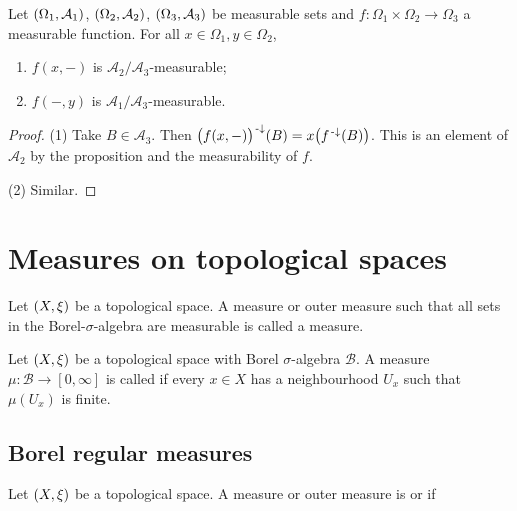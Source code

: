 \begin{corollary} \label{partialApplicationMeasurable}
Let $\sSet{\Omega_1, \mathcal{A}_1}$, $\sSet{\Omega_2, \mathcal{A}_2}$, $\sSet{\Omega_3, \mathcal{A}_3}$ be measurable sets and $f: \Omega_1\times\Omega_2 \to \Omega_3$ a measurable function. For all $x\in\Omega_1, y\in\Omega_2$,
\begin{enumerate}
\item $f(x,-)$ is $\mathcal{A}_2/\mathcal{A}_3$-measurable;
\item $f(-,y)$ is $\mathcal{A}_1/\mathcal{A}_3$-measurable.
\end{enumerate}
\end{corollary}
\begin{proof}
(1) Take $B\in \mathcal{A}_3$. Then $\big(f(x,-)\big)^{{\text{\hspace{0.15em}-}\downarrow}}(B) = x\big(f^{\text{\hspace{0.15em}-}\downarrow}(B)\big)$. This is an element of $\mathcal{A}_2$ by the proposition and the measurability of $f$.

(2) Similar.
\end{proof}

\section{Measures on topological spaces}
\begin{definition}
Let $\sSet{X, \xi}$ be a topological space. A measure or outer measure such that all sets in the Borel-$\sigma$-algebra are measurable is called a  measure.
\end{definition}


\begin{definition}
Let $\sSet{X, \xi}$ be a topological space with Borel $\sigma$-algebra $\mathcal{B}$. A measure $\mu: \mathcal{B} \to [0,\infty]$ is called  if every $x\in X$ has a neighbourhood $U_x$ such that $\mu(U_x)$ is finite.
\end{definition}

\subsection{Borel regular measures}
\begin{definition}
Let $\sSet{X, \xi}$ be a topological space. A measure or outer measure is  or  if
\end{definition}

